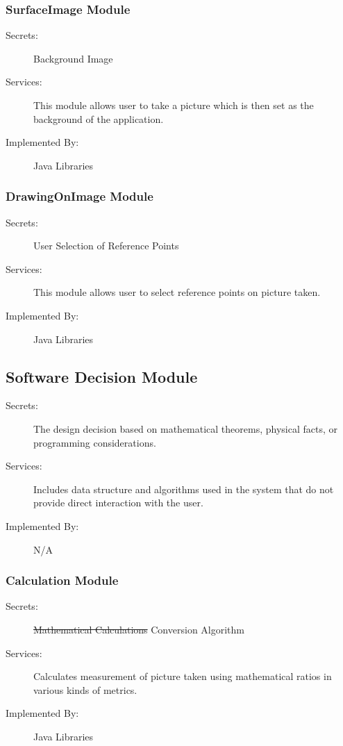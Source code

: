 \documentclass[12pt, titlepage]{article}
\begin{document}
\subsubsection{SurfaceImage Module}
\begin{description}
\item[Secrets:] Background Image
\item[Services:] This module allows user to take a picture which is then set as the background of the application.
\item[Implemented By:] Java Libraries
\end{description}

\subsubsection{DrawingOnImage Module}
\begin{description}
\item[Secrets:] User Selection of Reference Points
\item[Services:] This module allows user to select reference points on picture taken.
\item[Implemented By:] Java Libraries
\end{description}

\subsection{Software Decision Module}
\begin{description}
\item[Secrets:] The design decision based on mathematical theorems, physical facts, or programming considerations.
\item[Services:] Includes data structure and algorithms used in the system that
  do not provide direct interaction with the user. 
\item[Implemented By:] N/A
\end{description}

\subsubsection{Calculation Module}
\begin{description}
\item[Secrets:] \sout{Mathematical Calculations} {\color{red} Conversion Algorithm}
\item[Services:] Calculates measurement of picture taken using mathematical ratios in various kinds of metrics.
\item[Implemented By:] Java Libraries
\end{description}
\end{document}
